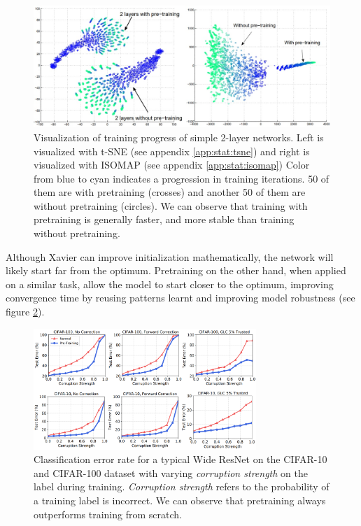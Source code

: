 \begin{figure}
    \centering
    \includegraphics[width=1\textwidth]{images/introduction/pretrain_vis.jpg}
    \caption{Visualization of training progress of simple 2-layer networks. Left is visualized with t-SNE (see appendix \ref{app:stat:tsne}) and right is visualized with ISOMAP (see appendix \ref{app:stat:isomap}) Color from blue to cyan indicates a progression in training iterations. 50 of them are with pretraining (crosses) and another 50 of them are without pretraining (circles). We can observe that training with pretraining is generally faster, and more stable than training without pretraining.\cite{erhanWhyDoesUnsupervised}} 
    \label{fig:pretrain_tsne}
\end{figure}

Although Xavier can improve initialization mathematically, the network will likely start far from the optimum. Pretraining on the other hand, when applied on a similar task, allow the model to start closer to the optimum, improving convergence time by reusing patterns learnt and improving model robustness\cite{hendrycksUsingPreTrainingCan2019} (see figure \ref{fig:pretrain_robustness}).


\begin{figure}
    \centering
    \includegraphics[width=0.75\textwidth]{images/introduction/pretrain_robustness.png}
    \caption{Classification error rate for a typical Wide ResNet\cite{zagoruykoWideResidualNetworks2017} on the CIFAR-10 and CIFAR-100 dataset with varying \textit{corruption strength} on the label during training. \textit{Corruption strength} refers to the probability of a training label is incorrect. We can observe that pretraining always outperforms training from scratch.} 
    \label{fig:pretrain_robustness}
\end{figure}

